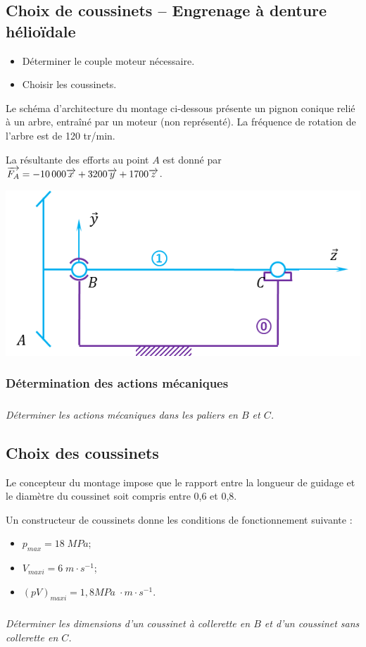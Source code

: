 \documentclass[10pt]{article}
\begin{document}

\subsection*{Choix de coussinets -- Engrenage à denture hélioïdale}
\setcounter{subparagraph}{0}
\begin{obj}
\begin{itemize}
\item Déterminer le couple moteur nécessaire.
\item Choisir les coussinets.
\end{itemize}
\end{obj}


Le schéma d'architecture du montage ci-dessous présente un pignon conique relié à un arbre,  entraîné par un moteur (non représenté). La fréquence de rotation de l'arbre est de 120 tr/min.

La résultante des efforts au point $A$ est donné par $\overrightarrow{F_A} = -10\,000\overrightarrow{x} +3200\overrightarrow{y} + 1700\overrightarrow{z}$.

\begin{center}
\includegraphics[width=.75\textwidth]{images/modele2}
\end{center}

\subsubsection*{Détermination des actions mécaniques}

\subparagraph{}
\textit{Déterminer les actions mécaniques dans les paliers en $B$ et $C$.}

\subsection*{Choix des coussinets}
Le concepteur du montage impose que le rapport entre la longueur de guidage et le diamètre du coussinet soit compris entre 0,6 et 0,8.

Un constructeur de coussinets donne les conditions de fonctionnement suivante : 
\begin{itemize}
\item $p_{max}=18 \; MPa$;
\item $V_{maxi}= 6\; m\cdot s^{-1}$;
\item $(pV)_{maxi} = 1,8 MPa \; \cdot m\cdot s^{-1}$.
\end{itemize}

\subparagraph{}
\textit{Déterminer les dimensions d'un coussinet à collerette en $B$ et d'un coussinet sans collerette en $C$.}
\end{document}
